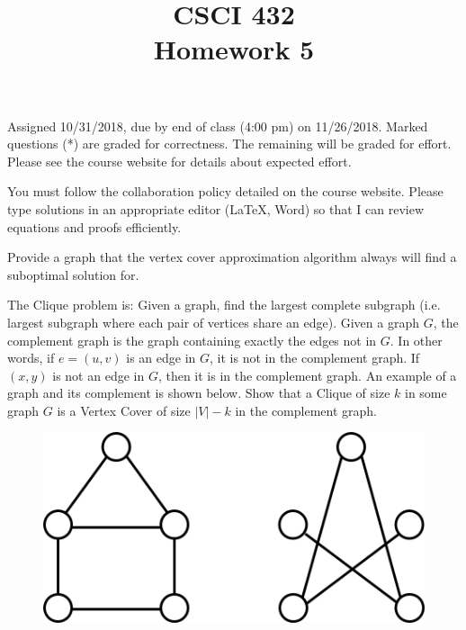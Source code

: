 \documentclass[12pt]{article}
\newenvironment{problem}[2][Problem]
{\begin{trivlist}
\item[\hskip \labelsep {\bfseries #1}\hskip \labelsep {\bfseries #2.}]}{\end{trivlist}}
\begin{document}
 
\title{CSCI 432\\Homework 5}
\date{}
\maketitle

Assigned 10/31/2018, due by end of class (4:00 pm) on 11/26/2018. Marked questions (*) are graded for correctness. The remaining will be graded for effort. Please see the course website for details about expected effort.

You must follow the collaboration policy detailed on the course website. Please type solutions in an appropriate editor (\LaTeX, Word) so that I can review equations and proofs efficiently. 

\begin{problem}{1*}
Provide a graph that the vertex cover approximation algorithm always will find a suboptimal solution for.
\end{problem}


\begin{problem}{2*}
The Clique problem is: Given a graph, find the largest complete subgraph (i.e. largest subgraph where each pair of vertices share an edge). Given a graph $G$, the complement graph is the graph containing exactly the edges not in $G$. In other words, if $e=(u,v)$ is an edge in $G$, it is not in the complement graph. If $(x,y)$ is not an edge in $G$, then it is in the complement graph. An example of a graph and its complement is shown below. Show that a Clique of size $k$ in some graph $G$ is a Vertex Cover of size $|V|-k$ in the complement graph.

\begin{figure}[H]
\centering
\includegraphics[scale=.5]{Homework5_comp.png}
\end{figure}
\end{problem}
\end{document}
